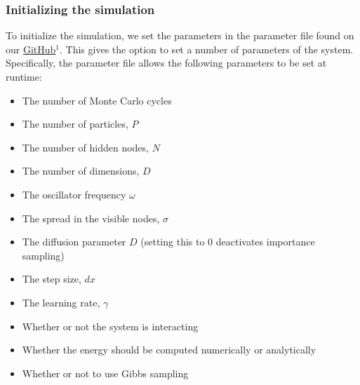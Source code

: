 \documentclass[a4paper, 10pt]{article}
\begin{document}
	\subsubsection{Initializing the simulation}
	To initialize the simulation, we set the parameters in the parameter file found on our \href{https://github.com/dulte/FYS4411/tree/master/Project2}{GitHub}$^1$. This gives the option to set a number of parameters of the system. Specifically, the parameter file allows the following parameters to be set at runtime:
	\begin{itemize}
	\item The number of Monte Carlo cycles
	\item The number of particles, $P$
	\item The number of hidden nodes, $N$
	\item The number of dimensions, $D$
	\item The oscillator frequency $\omega$
	\item The spread in the visible nodes, $\sigma$
	\item The diffusion parameter $D$ (setting this to $0$ deactivates importance sampling)
	\item The step size, $dx$
	\item The learning rate, $\gamma$
	\item Whether or not the system is interacting
	\item Whether the energy should be computed numerically or analytically
	\item Whether or not to use Gibbs sampling
	\end{itemize}
\end{document}

